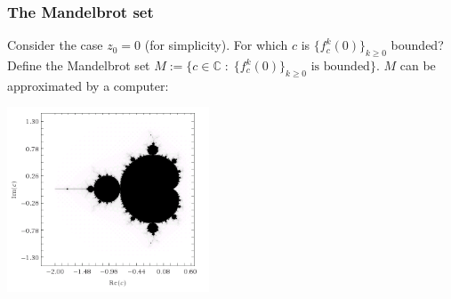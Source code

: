 \documentclass{beamer} %
\theoremstyle{definition} %
\newcommand{\Cplx}{\mathbb{C}}
\begin{document}
\begin{frame}\frametitle{The Mandelbrot set}
    Consider the case $z_0 = 0$ (for simplicity). For which $c$ is $\{f_c^k(0)\}_{k\geq 0}$ bounded?
    Define the Mandelbrot set $M := \{c \in \Cplx\;:\;\{f^k_c(0)\}_{k\geq 0}\text{ is bounded}\}$.
    $M$ can be approximated by a computer:
    \begin{center}
        \includegraphics[width=60mm]{img/mandelbrot.png}
    \end{center}
\end{frame}
% 
\end{document}
